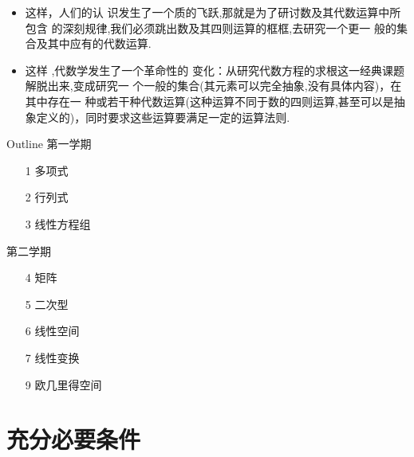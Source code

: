 \documentclass[13pt]{beamer}
\begin{document}
\begin{frame}
\begin{itemize}
	\item 这样，人们的认 识发生了一个质的飞跃,那就是为了研讨数及其代数运算中所包含 的深刻规律,我们必须跳出数及其四则运算的框框,去研究一个更一 般的集合及其中应有的代数运算.

	\item  这样 ,代数学发生了一个革命性的 变化：从研究代数方程的求根这一经典课题解脱出来,变成研究一 个一般的\alert{集合}(其元素可以完全抽象,没有具体内容)，在其中存在一 种或若干种\alert{代数运算}(这种运算不同于数的四则运算,甚至可以是抽 象定义的)，同时要求这些运算要满足一定的运算法则. 
\end{itemize}
\end{frame}


\begin{frame}{Outline}
\alert{第一学期}
\begin{itemize}
\item[1]多项式
\item[2] 行列式
\item[3] 线性方程组
\end{itemize}

\alert{第二学期}
\begin{itemize}
\item[4] 矩阵
\item[5] 二次型
\item[6] 线性空间
\item[7] 线性变换
\item[9] 欧几里得空间
\end{itemize}

\end{frame}


\section{充分必要条件}
\end{document}
